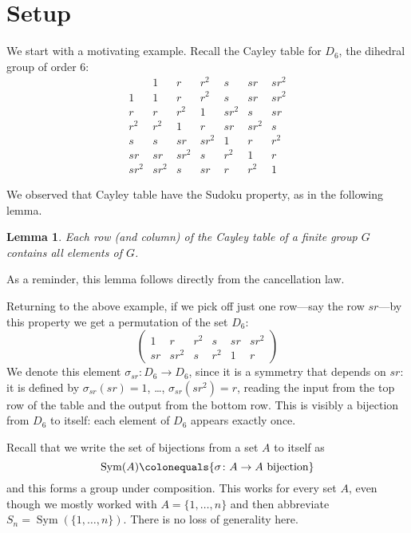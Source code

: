 \documentclass[12pt]{amsart}
\numberwithin{equation}{section}
\newtheorem{lem}[equation]{Lemma}
\theoremstyle{definition}
\theoremstyle{remark}
\numberwithin{equation}{section}
\DeclareMathOperator{\Sym}{Sym}
\begin{document}
\section{Setup} \label{sec:setup}

We start with a motivating example.  Recall the Cayley table for $D_6$, the dihedral group of order $6$:
\[ \begin{array}{c|cccccccc} 
& 1 & r & r^2 & s & sr & sr^2 \\
\hline
1 & 1 & r & r^2 & s & sr & sr^2 \\
r & r & r^2 & 1 & sr^2 & s & sr \\
r^2 & r^2 & 1 & r & sr & sr^2 & s \\
s & s & sr & sr^2 & 1 & r & r^2 \\
sr & sr & sr^2 & s & r^2 & 1 & r \\
sr^2 & sr^2 & s & sr & r & r^2 & 1
\end{array} \]

We observed that Cayley table have the Sudoku property, as in the following lemma.

\begin{lem}
Each row (and column) of the Cayley table of a finite group $G$ contains all elements of $G$.
\end{lem}

As a reminder, this lemma follows directly from the cancellation law.

Returning to the above example, if we pick off just one row---say the row $sr$---by this property we get a permutation of the set $D_6$:
\begin{equation}  \label{eqn:sr}
\begin{pmatrix}
1 & r & r^2 & s & sr & sr^2 \\
sr & sr^2 & s & r^2 & 1 & r 
\end{pmatrix} 
\end{equation}
We denote this element $\sigma_{sr} \colon D_6 \to D_6$, since it is a symmetry that depends on $sr$: it is defined by $\sigma_{sr}(sr) = 1$, \dots, $\sigma_{sr}(sr^2)=r$, reading the input from the top row of the table and the output from the bottom row.  This is visibly a bijection from $D_6$ to itself: each element of $D_6$ appears exactly once.  

Recall that we write the set of bijections from a set $A$ to itself as
\[ \Sym(A) \colonequals \{\sigma \colon A \to A \textup{ bijection}\} \]
and this forms a group under composition.  This works for every set $A$, even though we mostly worked with $A=\{1,\dots,n\}$ and then abbreviate $S_n=\Sym(\{1,\dots,n\})$.  There is no loss of generality here.
\end{document}
